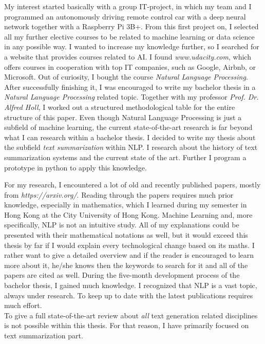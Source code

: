 My interest started basically with a group IT-project, in which my team and I programmed an autonomously driving remote control car with a deep neural network together with a Raspberry Pi 3B+. From this first project on, I selected all my further elective courses to be related to machine learning or data science in any possible way. I wanted to increase my knowledge further, so I searched for a website that provides courses related to AI. I found \textit{www.udacity.com}, which offers courses in cooperation with top IT companies, such as Google, Airbnb, or Microsoft. Out of curiosity, I bought the course \textit{Natural Language Processing}. After successfully finishing it, I was encouraged to write my bachelor thesis in a \textit{Natural Language Processing} related topic. 
Together with my professor \textit{Prof. Dr. Alfred Holl}, I worked out a structured methodological table for the entire structure of this paper. 
Even though Natural Language Processing is just a subfield of machine learning, the current state-of-the-art research is far beyond what I can research within a bachelor thesis. I decided to write my thesis about the subfield \textit{text summarization} within NLP. I research about the history of text summarization systems and the current state of the art.
Further I program a prototype in python to apply this knowledge.

For my research, I encountered a lot of old and recently published papers, mostly from \textit{https://arxiv.org/}. 
Reading through the papers requires much prior knowledge, especially in mathematics, which I learned during my semester in Hong Kong at the City University of Hong Kong. 
Machine Learning and, more specifically, NLP is not an intuitive study. All of my explanations could be presented with their mathematical notations as well, but it would exceed this thesis by far if I would explain every technological change based on its maths. I rather want to give a detailed overview and if the reader is encouraged to learn more about it, he/she knows then the keywords to search for it and all of the papers are cited as well.
During the five-month development process of the bachelor thesis, I gained much knowledge. I recognized that NLP is a vast topic, always under research. To keep up to date with the latest publications requires much effort. \\
To give a full state-of-the-art review about \textit{all} text generation related disciplines is not possible within this thesis. For that reason, I have primarily focused on text summarization part.




